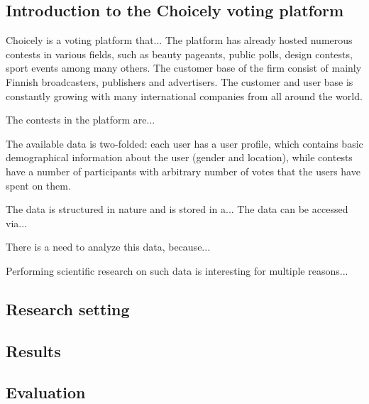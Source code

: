\subsection{Introduction to the Choicely voting platform}
    Choicely is a voting platform that... The platform has already hosted numerous contests in various fields, such as beauty pageants, public polls, design contests, sport events among many others. The customer base of the firm consist of mainly Finnish broadcasters, publishers and advertisers. The customer and user base is constantly growing with many international companies from all around the world.   
    
    The contests in the platform are...

    The available data is two-folded: each user has a user profile, which contains basic demographical information about the user (gender and location), while contests have a number of participants with arbitrary number of votes that the users have spent on them. 

    The data is structured in nature and is stored in a... The data can be accessed via...

    There is a need to analyze this data, because...

    Performing scientific research on such data is interesting for multiple reasons...

\subsection{Research setting}


\subsection{Results}


\subsection{Evaluation}
